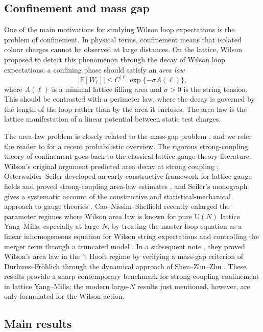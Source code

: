 \documentclass[11pt,a4paper,reqno]{amsart}
\theoremstyle{definition}
\theoremstyle{remark}
\newcommand\U{{\mathrm U}}
\newcommand\E{{\mathbb E}}
\begin{document}
\subsection{Confinement and mass gap}

One of the main motivations for studying Wilson loop expectations is the problem of confinement. In physical terms, confinement means that isolated colour charges cannot be observed at large distances.  On the lattice, Wilson proposed to detect this phenomenon through the decay of Wilson loop expectations: a confining phase should satisfy an \emph{area law}
\[
|\E[W_\ell]|\le C^{|\ell|}\exp\{-\sigma A(\ell)\},
\]
where $A(\ell)$ is a minimal lattice filling area and $\sigma>0$ is the string tension.  This should be contrasted with a perimeter law, where the decay is governed by the length of the loop rather than by the area it encloses.  The area law is the lattice manifestation of a linear potential between static test charges.

The area-law problem is closely related to the mass-gap problem \cite{JW}, and we refer the reader to \cite{Cha21} for a recent probabilistic overview. The rigorous strong-coupling theory of confinement goes back to the classical lattice gauge theory literature: Wilson's original argument predicted area decay at strong coupling \cite{Wil74}; Osterwalder--Seiler developed an early constructive framework for lattice gauge fields and proved strong-coupling area-law estimates \cite{OS78}, and Seiler's monograph gives a systematic account of the constructive and statistical-mechanical approach to gauge theories \cite{Sei82}.  Cao--Nissim--Sheffield recently enlarged the parameter regimes where Wilson area law is known for pure $\U(N)$ lattice Yang--Mills, especially at large $N$, by treating the master loop equation as a linear inhomogeneous equation for Wilson string expectations and controlling the merger term through a truncated model \cite{CNS25a}.  In a subsequent note \cite{CNS25}, they proved Wilson's area law in the 't Hooft regime by verifying a mass-gap criterion of Durhuus--Fr\"ohlich through the dynamical approach of Shen--Zhu--Zhu \cite{DF80,SZZ23}. These results provide a sharp contemporary benchmark for strong-coupling confinement in lattice Yang--Mills; the modern large-$N$ results just mentioned, however, are only formulated for the Wilson action.

\subsection{Main results}
\end{document}
